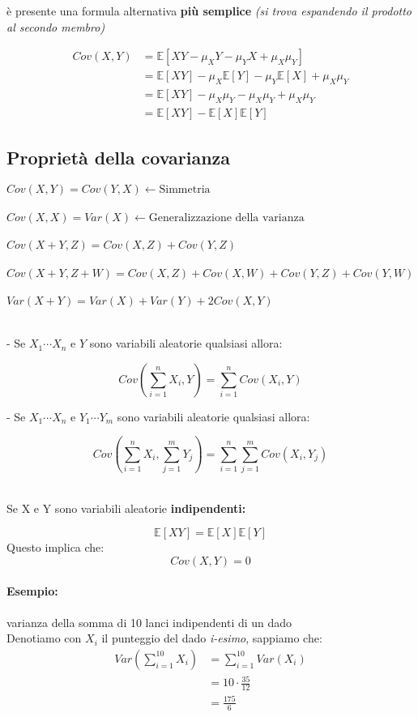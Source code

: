 \documentclass[]{article}
\newcommand{\ev}{\mathbb{E}[X]}
\renewcommand{\ev}[1]{\mathbb{E}[#1]}
\begin{document}
    è presente una formula alternativa \textbf{più semplice} \textit{(si trova espandendo il prodotto al secondo membro)}

    \begin{equation*}
        \begin{split} 
            Cov(X, Y) &= \ev{XY - \mu_XY - \mu_YX + \mu_X \mu_Y} \\
            & = \ev{XY} - \mu_X \ev{Y} - \mu_Y \ev{X} + \mu_X \mu_Y \\ 
            & = \ev{XY} - \mu_X \mu_Y - \mu_X \mu_Y  + \mu_X \mu_Y  \\
            & = \ev{XY} - \ev{X} \ev{Y}
        \end{split}
    \end{equation*}


    \subsection{Proprietà della covarianza}
    $ Cov(X, Y) = Cov(Y, X) \longleftarrow \text{Simmetria} $ \\ \\
    $ Cov(X, X) = Var(X) \longleftarrow \text{Generalizzazione della varianza} $ \\ \\
    $ Cov(X+Y, Z) = Cov(X, Z) + Cov(Y, Z) $ \\ \\
    $ Cov(X+Y, Z+W) = Cov(X, Z) + Cov(X, W) + Cov(Y, Z) + Cov(Y, W) $ \\ \\
    $ Var(X + Y) = Var(X) + Var(Y) + 2 Cov(X, Y) $ \\ \\
    
    \centerline{- Se $X_1 \cdots X_n$ e $Y $ sono variabili aleatorie qualsiasi allora:}
    \[ Cov(\sum_{i = 1}^{n}X_i, Y) = \sum_{i = 1}^{n} Cov(X_i, Y) \]

    \centerline{- Se $X_1 \cdots X_n$ e $Y_1 \cdots Y_m$ sono variabili aleatorie qualsiasi allora:}
    \[ Cov(\sum_{i = 1}^{n}X_i, \sum_{j = 1}^{m} Y_j) = \sum_{i = 1}^{n} \sum_{j = 1}^{m} Cov(X_i, Y_j) \] \\
    \linebreak[10]
    \centerline{Se X e Y sono variabili aleatorie \textbf{indipendenti:}}
    \[ \ev{XY} = \ev{X} \ev{Y} \]
    Questo implica che:
    \[ Cov(X, Y) = 0 \]

    \paragraph{Esempio:} varianza della somma di 10 lanci indipendenti di un dado \\
    Denotiamo con \textbf{$X_i$} il punteggio del dado \textit{i-esimo}, sappiamo che:
    \begin{equation*}
        \begin{split}
            Var(\sum_{i = 1}^{10} X_i) &= \sum_{i = 1}^{10} Var(X_i) \\
            & = 10 \cdot \frac{35}{12} \\
            & = \frac{175}{6}
        \end{split}
    \end{equation*}
    
\end{document}
